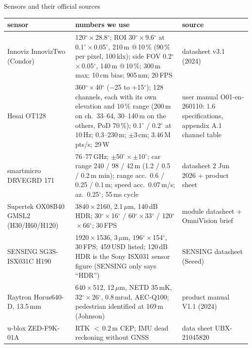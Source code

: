 \documentclass[aspectratio=169,11pt]{beamer}
\begin{document}
\begin{frame}{Sensors and their official sources}
  \scriptsize
  \renewcommand{\arraystretch}{1.0}
  \setlength{\tabcolsep}{3pt}
  \begin{tabular}{@{}L{3.2cm} L{7.3cm} L{3.9cm}@{}}
    \toprule
    sensor & numbers we use & source \\
    \midrule
    Innoviz InnovizTwo (Condor) & 120$^\circ$\,$\times$\,28.8$^\circ$; ROI 30$^\circ$\,$\times$\,9.6$^\circ$ at 0.1$^\circ$\,$\times$\,0.05$^\circ$, 210\,m @\,10\,\%
      (90\,\% per pixel, 100\,klx); side FOV 0.2$^\circ$\,$\times$\,0.05$^\circ$, 140\,m @\,10\,\%; 300\,m max; 10\,cm bias; 905\,nm; 20\,FPS
      & datasheet v3.1 (2024) \\
    Hesai OT128 & 360$^\circ$\,$\times$\,40$^\circ$ ($-$25 to +15$^\circ$); 128 channels, each with its own elevation and
      10\,\% range (200\,m on ch.\ 33--64, 30--140\,m on the others, PoD 70\,\%); 0.1$^\circ$ / 0.2$^\circ$ at 10\,Hz;
      0.3--230\,m; $\pm$3\,cm; 3.46\,M pts/s; 29\,W
      & user manual O01-en-260110: 1.6 specifications, appendix A.1 channel table \\
    smartmicro DRVEGRD 171 & 76--77\,GHz; $\pm$50$^\circ$\,$\times$\,$\pm$10$^\circ$; car range 240 / 98 / 42\,m (1.2 / 0.5 / 0.2\,m min);
      range acc.\ 0.6 / 0.25 / 0.1\,m; speed acc.\ 0.07\,m/s; az.\ 0.25$^\circ$; 55\,ms cycle & datasheet 2 Jun 2026 + product sheet \\
    Supertek OX08B40 GMSL2 (H30/H60/H120) & 3840\,$\times$\,2160, 2.1\,$\mu$m, 140\,dB HDR; 30$^\circ$\,$\times$\,16$^\circ$ / 60$^\circ$\,$\times$\,33$^\circ$ /
      120$^\circ$\,$\times$\,66$^\circ$; 30\,FPS & module datasheet + OmniVision brief \\
    SENSING SG3S-ISX031C H190 & 1920\,$\times$\,1536, 3\,$\mu$m, 196$^\circ$\,$\times$\,154$^\circ$, 30\,FPS; 459\,USD listed;
      120\,dB HDR is the Sony ISX031 sensor figure (SENSING only says ``HDR'') & SENSING datasheet (Seeed) \\
    Raytron Horus640-D, 13.5\,mm & 640\,$\times$\,512, 12\,$\mu$m, NETD 35\,mK, 32$^\circ$\,$\times$\,26$^\circ$, 0.8\,mrad, AEC-Q100;
      pedestrian identified at 169\,m (Johnson) & product manual V1.1 (2024) \\
    u-blox ZED-F9K-01A & RTK $<$\,0.2\,m CEP; IMU dead reckoning without GNSS & data sheet UBX-21045820 \\
    \bottomrule
  \end{tabular}

  \vspace{0.4em}
\end{frame}
\end{document}
